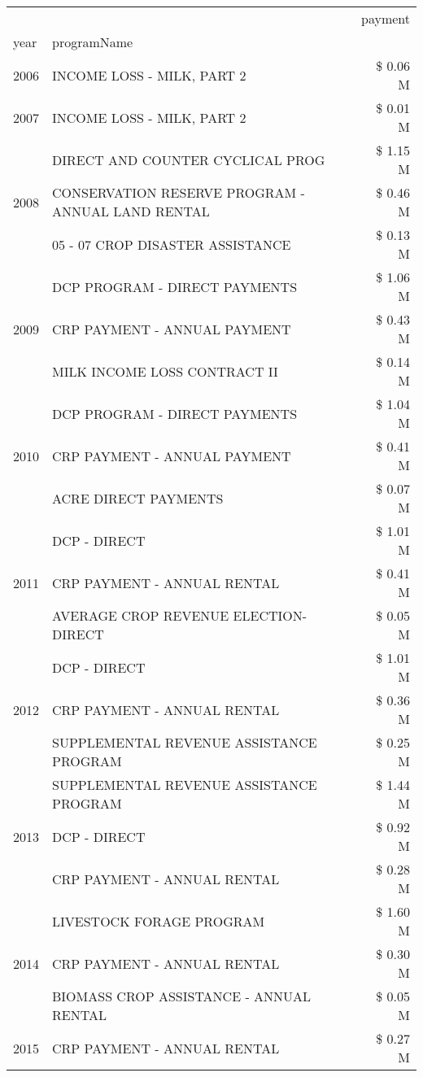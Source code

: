 \begin{tabular}{llr}
\toprule
 &  & payment \\
year & programName &  \\
\midrule
2006 & INCOME LOSS - MILK, PART 2 & \$ 0.06 M \\
\cline{1-3}
2007 & INCOME LOSS - MILK, PART 2 & \$ 0.01 M \\
\cline{1-3}
\multirow[t]{3}{*}{2008} & DIRECT AND COUNTER CYCLICAL PROG & \$ 1.15 M \\
 & CONSERVATION RESERVE PROGRAM - ANNUAL LAND RENTAL & \$ 0.46 M \\
 & 05 - 07 CROP DISASTER ASSISTANCE & \$ 0.13 M \\
\cline{1-3}
\multirow[t]{3}{*}{2009} & DCP PROGRAM - DIRECT PAYMENTS & \$ 1.06 M \\
 & CRP PAYMENT - ANNUAL PAYMENT & \$ 0.43 M \\
 & MILK INCOME LOSS CONTRACT II & \$ 0.14 M \\
\cline{1-3}
\multirow[t]{3}{*}{2010} & DCP PROGRAM - DIRECT PAYMENTS & \$ 1.04 M \\
 & CRP PAYMENT - ANNUAL PAYMENT & \$ 0.41 M \\
 & ACRE DIRECT PAYMENTS & \$ 0.07 M \\
\cline{1-3}
\multirow[t]{3}{*}{2011} & DCP - DIRECT & \$ 1.01 M \\
 & CRP PAYMENT - ANNUAL RENTAL & \$ 0.41 M \\
 & AVERAGE CROP REVENUE ELECTION-DIRECT & \$ 0.05 M \\
\cline{1-3}
\multirow[t]{3}{*}{2012} & DCP - DIRECT & \$ 1.01 M \\
 & CRP PAYMENT - ANNUAL RENTAL & \$ 0.36 M \\
 & SUPPLEMENTAL REVENUE ASSISTANCE PROGRAM & \$ 0.25 M \\
\cline{1-3}
\multirow[t]{3}{*}{2013} & SUPPLEMENTAL REVENUE ASSISTANCE PROGRAM & \$ 1.44 M \\
 & DCP - DIRECT & \$ 0.92 M \\
 & CRP PAYMENT - ANNUAL RENTAL & \$ 0.28 M \\
\cline{1-3}
\multirow[t]{3}{*}{2014} & LIVESTOCK FORAGE PROGRAM & \$ 1.60 M \\
 & CRP PAYMENT - ANNUAL RENTAL & \$ 0.30 M \\
 & BIOMASS CROP ASSISTANCE - ANNUAL RENTAL & \$ 0.05 M \\
\cline{1-3}
\multirow[t]{3}{*}{2015} & CRP PAYMENT - ANNUAL RENTAL & \$ 0.27 M \\

\end{tabular}
